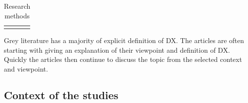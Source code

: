 \documentclass[english, 12pt, a4paper, sci, utf8, a-1b, online]{aaltothesis}
\begin{document}
\begin{center}
\begin{longtable}{p{0.3\linewidth}p{0.6\linewidth}}
    \caption{Research methods}                                                                                                                                                                                                                                                                                                                                                                                                                                                                                                                                                                                                                                                                                                                                                                                                                                                                                                          \\
    \label{table:research-methods}                                                                                                                                                                                                                                                                                                                                                                                                                                                                                                                                                                                                                                                                                                                                                                                                                                                                                                      \\
  \end{longtable}
\end{center}
\renewcommand{\arraystretch}{1}

Grey literature has a majority of explicit definition of DX. The articles are often starting with giving an explanation of their viewpoint and definition of DX. Quickly the articles then continue to discuss the topic from the selected context and viewpoint.

\subsection{Context of the studies}
\end{document}
